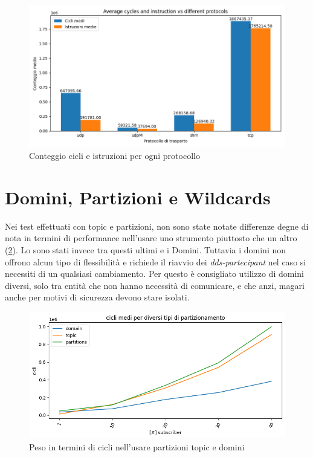 \begin{figure}[H]
    \includegraphics[width=\textwidth]{./results/test1_cyclinstr.png} 
        \caption{Conteggio cicli e istruzioni per ogni protocollo}
        \label{fig:test3_different_protocols}
\end{figure}

\section{Domini, Partizioni e Wildcards}
Nei test effettuati con topic e partizioni, non sono state notate differenze degne di nota in termini di performance nell'usare uno strumento piuttosto che un altro (\ref{fig:test2parttopicdomain}). Lo sono stati invece tra questi ultimi e i Domini. Tuttavia i domini non offrono alcun tipo di flessibilità e richiede il riavvio dei \emph{dds-partecipant} nel caso si necessiti di un qualsiasi cambiamento. Per questo è consigliato utilizzo di domini diversi, solo tra entità che non hanno necessità di comunicare, e che anzi, magari anche per motivi di sicurezza devono stare isolati. 

\begin{figure}[H]
    \includegraphics[width=\textwidth]{./results/test2_cicli_partvstopicvsdomaain.png} 
        \caption{Peso in termini di cicli nell'usare partizioni topic e domini}
        \label{fig:test2parttopicdomain}
\end{figure}

